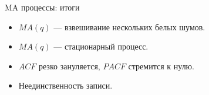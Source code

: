 \begin{frame}{MA процессы: итоги}

  \begin{itemize}[<+->]
    \item $MA(q)$ — взвешивание нескольких белых шумов. 
    \item $MA(q)$ — стационарный процесс. 
    \item $ACF$ резко зануляется, $PACF$ стремится к нулю.
    \item Неединственность записи. 
  \end{itemize}
\end{frame}



